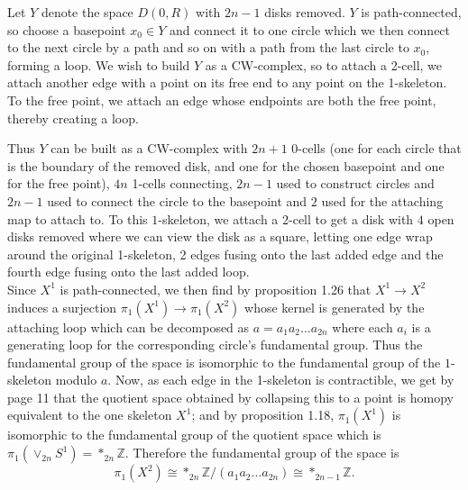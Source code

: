 \documentclass[a4paper]{article}
\begin{document}
 Let $Y$ denote the space $D(0,R)$ with $2n-1$ disks removed. $Y$ is
 path-connected, so choose a basepoint $x_0 \in Y$
 and connect it to one circle which we then connect to the next circle by
 a path and so on with a path from the last circle to $x_0$, forming a loop.
 We wish to build $Y$ as a CW-complex, so to attach a 2-cell, we attach
 another edge with a point on its free end to any point on the 1-skeleton.
 To the free point, we attach an edge whose endpoints are both the free point,
 thereby creating a loop.\\
 \linebreak
 
 Thus $Y$ can be built as a CW-complex with $2n+1$ 0-cells
 (one for each circle that is the boundary of the removed disk, and one for the
 chosen basepoint and one for the free point), $4n$ 1-cells connecting, $2n-1$ used to construct circles and
 $2n-1$ used to connect the circle to the basepoint and $2$ used for the
 attaching map to attach to. To this
 $1$-skeleton, we attach a $2$-cell to get a disk with $4$
 open disks removed where we can view the disk as a square, letting one edge
 wrap around the original 1-skeleton, 2 edges fusing onto the last added edge
 and the fourth edge fusing onto the last added loop.\\
 Since $X^{1}$ is path-connected, we then find by proposition
 1.26 that $X^{1} \to X^{2}$ induces a surjection
 $\pi_1 \left( X^{1} \right) \to \pi_1 \left( X^2 \right) $
 whose kernel is generated by the attaching loop which can be decomposed as
 $a= a_1 a_2 \ldots a_{2n}$ where each $a_i$ is a generating loop for the
 corresponding circle's fundamental group. Thus
 the fundamental group of the space 
 is isomorphic to the fundamental group of
 the $1$-skeleton modulo $a$. Now, as each edge in the 1-skeleton is
 contractible, we get by page 11 that the quotient space obtained by collapsing
 this to a point is homopy equivalent to the one skeleton $X^{1}$; and
 by proposition 1.18, $\pi_1 (X^{1})$ is isomorphic to the fundamental group of
 the quotient space which is $\pi_1 \left( \lor_{2n} S^{1} \right) 
 = *_{2n} \mathbb{Z}$.  Therefore the fundamental group of the
 space is
 \[
 \pi_1 \left( X^2 \right) \cong
 *_{2n}\mathbb{Z} / \left( a_1 a_2 \ldots a_{2n} \right) 
 \cong *_{2n-1} \mathbb{Z}.
 \] 
 
\end{document}
